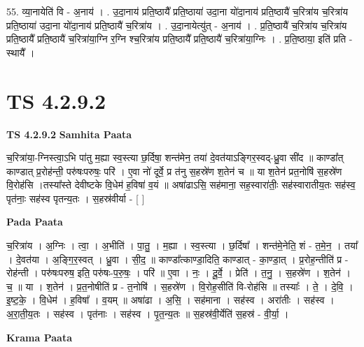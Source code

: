 \documentclass[17pt]{extarticle}
\begin{document}
55. व्या॒नायेति॑ वि - अ॒नाय॑ । . उ॒दा॒नाय॑ प्रति॒ष्ठायै᳚ प्रति॒ष्ठाया॑ उदा॒ना यो॑दा॒नाय॑ प्रति॒ष्ठायै॑ च॒रित्रा॑य च॒रित्रा॑य प्रति॒ष्ठाया॑ उदा॒ना यो॑दा॒नाय॑ प्रति॒ष्ठायै॑ च॒रित्रा॑य । . उ॒दा॒नायेत्यु॑त् - अ॒नाय॑ । . प्र॒ति॒ष्ठायै॑ च॒रित्रा॑य च॒रित्रा॑य प्रति॒ष्ठायै᳚ प्रति॒ष्ठायै॑ च॒रित्रा॑या॒ग्नि र॒ग्नि श्च॒रित्रा॑य प्रति॒ष्ठायै᳚ प्रति॒ष्ठायै॑ च॒रित्रा॑या॒ग्निः । . प्र॒ति॒ष्ठाया॒ इति॑ प्रति - स्थायै᳚ । \newline
\pagebreak
{}

\section{ TS 4.2.9.2 }

\textbf{TS 4.2.9.2 } \newline
\textbf{Samhita Paata} \newline

च॒रित्रा॑या॒-ग्निस्त्वा॒ऽभि पा॑तु म॒ह्या स्व॒स्त्या छ॒र्दिषा॒ शन्त॑मेन॒ तया॑ दे॒वत॑याऽङ्गिर॒स्वद्-ध्रु॒वा सी॑द ॥ काण्डा᳚त् काण्डात् प्र॒रोह॑न्ती॒ परु॑षःपरुषः॒ परि॑ । ए॒वा नो॑ दूर्वे॒ प्र त॑नु स॒हस्रे॑ण श॒तेन॑ च ॥ या श॒तेन॑ प्रत॒नोषि॑ स॒हस्रे॑ण वि॒रोह॑सि ।तस्या᳚स्ते देवीष्टके वि॒धेम॑ ह॒विषा॑ व॒यं ॥ अषा॑ढाऽसि॒ सह॑माना॒ सह॒स्वारा॑तीः॒ सह॑स्वारातीय॒तः सह॑स्व॒ पृत॑नाः॒ सह॑स्व पृतन्य॒तः । स॒हस्र॑वीर्या - [  ] \newline

\textbf{Pada Paata} \newline

च॒रित्रा॑य । अ॒ग्निः । त्वा॒ । अ॒भीति॑ । पा॒तु॒ । म॒ह्या । स्व॒स्त्या । छ॒र्दिषा᳚ । शन्त॑मे॒नेति॒ शं - त॒मे॒न॒ । तया᳚ । दे॒वत॑या । अ॒ङ्गि॒र॒स्वत् । ध्रु॒वा । सी॒द॒ ॥ काण्डा᳚त्काण्डा॒दिति॒ काण्डात् - का॒ण्डा॒त् । प्र॒रोह॒न्तीति॑ प्र - रोह॑न्ती । परु॑षःपरुष॒ इति॒ परु॑षः-प॒रु॒षः॒ । परि॑ ॥ ए॒वा । नः॒ । दू॒र्वे॒ । प्रेति॑ । त॒नु॒ । स॒हस्रे॑ण । श॒तेन॑ । च॒ ॥ या । श॒तेन॑ । प्र॒त॒नोषीति॑ प्र - त॒नोषि॑ । स॒हस्रे॑ण । वि॒रोह॒सीति॑ वि-रोह॑सि ॥ तस्याः᳚ । ते॒ । दे॒वि॒ । इ॒ष्ट॒के॒ । वि॒धेम॑ । ह॒विषा᳚ । व॒यम् ॥ अषा॑ढा । अ॒सि॒ । सह॑माना । सह॑स्व । अरा॑तीः । सह॑स्व । अ॒रा॒ती॒य॒तः । सह॑स्व । पृत॑नाः । सह॑स्व । पृ॒त॒न्य॒तः ॥ स॒हस्र॑वी॒र्येति॑ स॒हस्र॑ - वी॒र्या॒ ।  \newline


\textbf{Krama Paata} \newline
\end{document}
